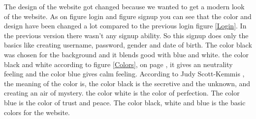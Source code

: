 The design of the website got changed because we wanted to get a modern look of the website. As on figure login and figure signup you can see that the color and design have been changed a lot compared to the previous login figure \ref{Login}. In the previous version there wasn’t any signup ability. So this signup does only the basics like creating username, password, gender and date of birth. The color black was chosen for the background and it blends good with blue and white. the color black and white according to figure \ref{Colors}, on page \pageref{Colors}, it gives an neutrality feeling and the color blue gives calm feeling. According to Judy Scott-Kemmis \cite{EmpowerColor}, the meaning of the color is,  the color black is the secretive and the unknown, and creating an air of mystery. the color white is the color of perfection. The color blue is the color of trust and peace. The color black, white and blue is the basic colors for the website.


